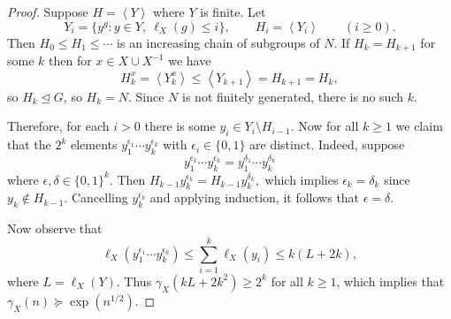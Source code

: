 \documentclass[10pt,a4paper]{amsart}
\newcommand\gen[1]{\left\langle#1\right\rangle}
\def\nsgp{\trianglelefteq}
\begin{document}
\begin{proof}
    Suppose $H = \gen{Y}$ where $Y$ is finite.
    Let
    \begin{equation}
        \label{eq:Y_i-def}
        Y_i = \{y^g : y \in Y,~\ell_X(g) \le i\}, \qquad H_i = \gen{Y_i} \qquad (i \ge 0).
    \end{equation}
    Then $H_0 \le H_1 \le \cdots$ is an increasing chain of subgroups of $N$. If $H_k = H_{k+1}$ for some $k$ then for $x \in X \cup X^{-1}$ we have
    \[
        H_k^x = \gen{Y_k^x} \le \gen{Y_{k+1}} = H_{k+1} = H_k,
    \]
    so $H_k \nsgp G$, so $H_k = N$.
    Since $N$ is not finitely generated, there is no such $k$.

    Therefore, for each $i > 0$ there is some $y_i \in Y_i \setminus H_{i-1}$.
    Now for all $k \ge 1$ we claim that the $2^k$ elements $y_1^{\epsilon_1} \cdots y_k^{\epsilon_k}$ with $\epsilon_i \in \{0,1\}$ are distinct. Indeed, suppose
    \[
        y_1^{\epsilon_1} \cdots y_k^{\epsilon_k} = y_1^{\delta_1} \cdots y_k^{\delta_k}
    \]
    where $\epsilon,\delta \in \{0,1\}^k$. Then
    \(
        H_{k-1} y_k^{\epsilon_k} = H_{k-1} y_k^{\delta_k},
    \)
    which implies $\epsilon_k = \delta_k$ since $y_k \notin H_{k-1}$.
    Cancelling $y_k^{\epsilon_k}$ and applying induction, it follows that $\epsilon = \delta$.

    Now observe that
    \[
        \ell_X(y_1^{\epsilon_1} \cdots y_k^{\epsilon_k}) \le \sum_{i=1}^k \ell_X(y_i) \le k (L + 2k),
    \]
    where $L = \ell_X(Y)$.
    Thus
    \(
        \gamma_X(kL + 2k^2) \ge 2^k
    \)
    for all $k \ge 1$,
    which implies that $\gamma_X(n) \succeq \exp(n^{1/2})$.
\end{proof}
\end{document}
